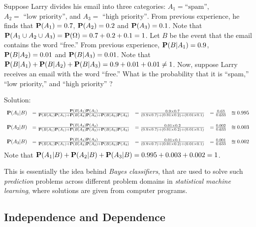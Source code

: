 \begin{example}[Wasserman2003~p.12]\label{Wasserman2003p12}
Suppose Larry divides his email into three categories: $A_1 = \text{``spam''}$, $A_2 =\text{ ``low priority''}$, and $A_3 = \text{ ``high priority''}$.  From previous experience, he finds that $\mathbf{P}(A_1) = 0.7$, $\mathbf{P}(A_2) = 0.2$ and $\mathbf{P}(A_3)=0.1$.  Note that $\mathbf{P}(A_1 \cup A_2 \cup A_3) = \mathbf{P}(\Omega) = 0.7+0.2+0.1 = 1$.  Let $B$ be the event that the email contains the word ``free.''  From previous experience, $\mathbf{P}(B|A_1) = 0.9$, $\mathbf{P}(B|A_2) = 0.01$ and $\mathbf{P}(B|A_3)=0.01$.  Note that $\mathbf{P}(B|A_1) + \mathbf{P}(B|A_2) + \mathbf{P}(B|A_3) = 0.9+0.01+0.01 \neq 1$.  Now, suppose Larry receives an email with the word ``free.''  What is the probability that it is ``spam,'' ``low priority,''  and ``high priority'' ?

Solution:\\[4pt]
{\scriptsize{
\[
\begin{array}{l l l l l}
\mathbf{P}(A_1 | B) 
&= \frac{\mathbf{P}(B|A_1)\mathbf{P}(A_1)}{\mathbf{P}(B|A_1)\mathbf{P}(A_1)+\mathbf{P}(B|A_2)\mathbf{P}(A_2)+\mathbf{P}(B|A_3)\mathbf{P}(A_3)} 
&= \frac{0.9 \times 0.7}{(0.9 \times 0.7)+ (0.01 \times 0.2) + (0.01 \times 0.1)}
&= \frac{0.63}{0.633}
&\approxeq 0.995 \\
\\
\mathbf{P}(A_2 | B) 
&= \frac{\mathbf{P}(B|A_2)\mathbf{P}(A_2)}{\mathbf{P}(B|A_1)\mathbf{P}(A_1)+\mathbf{P}(B|A_2)\mathbf{P}(A_2)+\mathbf{P}(B|A_3)\mathbf{P}(A_3)} 
&= \frac{0.01 \times 0.2}{(0.9 \times 0.7)+ (0.01 \times 0.2) + (0.01 \times 0.1)}
&= \frac{0.002}{0.633}
&\approxeq 0.003 \\
\\
\mathbf{P}(A_3 | B) 
&= \frac{\mathbf{P}(B|A_3)\mathbf{P}(A_3)}{\mathbf{P}(B|A_1)\mathbf{P}(A_1)+\mathbf{P}(B|A_2)\mathbf{P}(A_2)+\mathbf{P}(B|A_3)\mathbf{P}(A_3)} 
&= \frac{0.01 \times 0.1}{(0.9 \times 0.7)+ (0.01 \times 0.2) + (0.01 \times 0.1)}
&= \frac{0.001}{0.633}
&\approxeq 0.002 \\
\end{array}
\]
Note that $\mathbf{P}(A_1|B) + \mathbf{P}(A_2|B)+\mathbf{P}(A_3|B) = 0.995+0.003+0.002=1$.
}}

This is essentially the idea behind \emph{Bayes classifiers}, that are used to solve such \emph{prediction} problems across different problem domains in \emph{statistical machine learning}, where solutions are given from computer programs.
\end{example}

\subsection{Independence and Dependence}\label{S:IndepDep}

